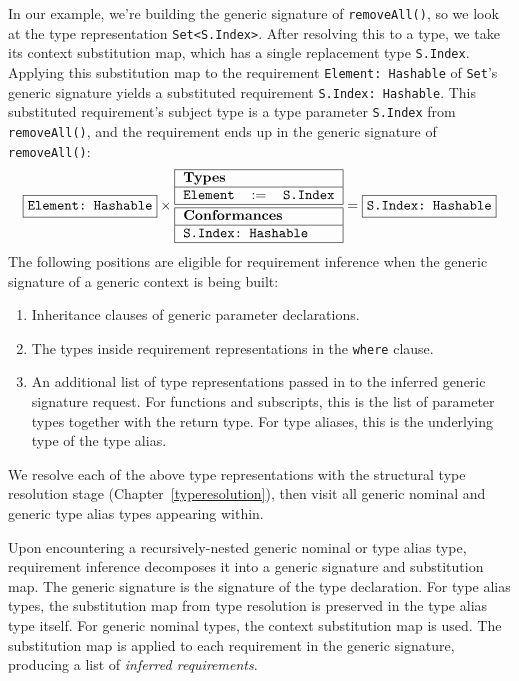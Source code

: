 \documentclass[a4paper,headsepline,bibliography=totoc,toc=flat,fleqn,twoside=semi]{scrbook}
\theoremstyle{definition}
\theoremstyle{definition}
\theoremstyle{definition}
\newcommand{\ttbox}[1]{\boxed{\mbox{\vphantom{pI\texttt{pI}}\texttt{#1}}}}
\newcommand{\SubMapC}[2]{\begin{tabular}{|lll|}
\hline
\multicolumn{3}{|l|}{\textbf{Types}}\\
\hline
#1\\
\hline
\hline
\multicolumn{3}{|l|}{\textbf{Conformances}}\\
\hline
#2\\
\hline
\end{tabular}}
\newcommand{\SubType}[2]{\texttt{#1}&$:=$&\texttt{#2}}
\newcommand{\SubConf}[1]{\multicolumn{3}{|l|}{\texttt{#1}}}
\begin{document}
In our example, we're building the generic signature of \texttt{removeAll()}, so we look at the type representation \texttt{Set<S.Index>}. After resolving this to a type, we take its context substitution map, which has a single replacement type \texttt{S.Index}. Applying this substitution map to the requirement \texttt{Element:\ Hashable} of \texttt{Set}'s generic signature yields a substituted requirement \texttt{S.Index:\ Hashable}. This substituted requirement's subject type is a type parameter \texttt{S.Index} from \texttt{removeAll()}, and the requirement ends up in the generic signature of \texttt{removeAll()}:
\[\ttbox{Element:\ Hashable}\times\SubMapC{\SubType{Element}{S.Index}}{\SubConf{S.Index:\ Hashable}}
= \ttbox{S.Index:\ Hashable}\]
The following positions are eligible for requirement inference when the generic signature of a generic context is being built:
\begin{enumerate}
\item Inheritance clauses of generic parameter declarations.
\item The types inside requirement representations in the \texttt{where} clause.
\item An additional list of type representations passed in to the inferred generic signature request. For functions and subscripts, this is the list of parameter types together with the return type. For type aliases, this is the underlying type of the type alias.
\end{enumerate}
We resolve each of the above type representations with the structural type resolution stage (Chapter~\ref{typeresolution}), then visit all generic nominal and generic type alias types appearing within.

Upon encountering a recursively-nested generic nominal or type alias type, requirement inference decomposes it into a generic signature and substitution map. The generic signature is the signature of the type declaration. For type alias types, the substitution map from type resolution is preserved in the type alias type itself. For generic nominal types, the context substitution map is used. The substitution map is applied to each requirement in the generic signature, producing a list of \emph{inferred requirements}.
\end{document}
